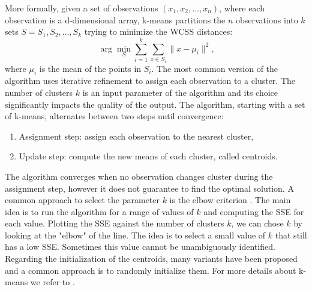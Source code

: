 \noindent
More formally, given a set of observations $(x_1, x_2, \dots, x_n)$, where each observation is a d-dimensional array, k-means partitions the $n$ observations into $k$ sets $S = {S_1, S_2, \dots, S_k}$ trying to minimize the \acf{WCSS} distances:
\begin{equation}
    \arg\min_{S} \sum_{i=1}^{k} \sum_{x \in S_i} \lVert x - \mu_i \rVert^2 \text{,}
\end{equation}
where $\mu_i$ is the mean of the points in $S_i$.
The most common version of the algorithm uses iterative refinement to assign each observation to a cluster. The number of clusters $k$ is an input parameter of the algorithm and its choice significantly impacts the quality of the output. 
The algorithm, starting with a set of k-means, alternates between two steps until convergence:
\begin{enumerate}
    \item Assignment step: assign each observation to the nearest cluster,
    \item Update step: compute the new means of each cluster, called centroids.
\end{enumerate}
The algorithm converges when no observation changes cluster during the assignment step, however it does not guarantee to find the optimal solution.
A common approach to select the parameter $k$ is the elbow criterion \cite{wierzchon_cluster_2018}. The main idea is to run the algorithm for a range of values of $k$ and computing the \acf{SSE} for each value. Plotting the SSE against the number of clusters $k$, we can chose $k$ by looking at the "elbow" of the line. The idea is to select a small value of $k$ that still has a low SSE. Sometimes this value cannot be unambiguously identified. Regarding the initialization of the centroids, many variants have been proposed and a common approach is to randomly initialize them. For more details about k-means we refer to \cite{wu_advances_2012}.




